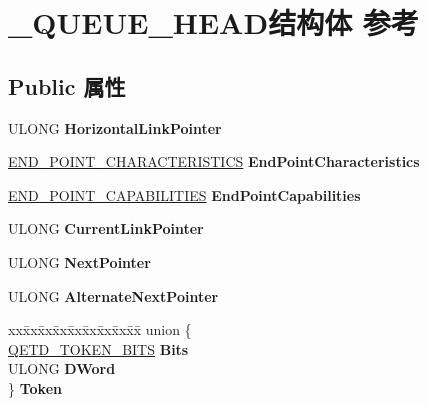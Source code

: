 \hypertarget{struct___q_u_e_u_e___h_e_a_d}{}\section{\+\_\+\+Q\+U\+E\+U\+E\+\_\+\+H\+E\+A\+D结构体 参考}
\label{struct___q_u_e_u_e___h_e_a_d}
\subsection*{Public 属性}
\begin{DoxyCompactItemize}
\item 
\mbox{\label{struct___q_u_e_u_e___h_e_a_d_a395e6d779b41b678e78476a8bbb34185}} 
U\+L\+O\+NG {\bfseries Horizontal\+Link\+Pointer}
\item 
\mbox{\label{struct___q_u_e_u_e___h_e_a_d_a80b0e12fb9069284bbbed667fff9c507}} 
\hyperlink{struct___e_n_d___p_o_i_n_t___c_h_a_r_a_c_t_e_r_i_s_t_i_c_s}{E\+N\+D\+\_\+\+P\+O\+I\+N\+T\+\_\+\+C\+H\+A\+R\+A\+C\+T\+E\+R\+I\+S\+T\+I\+CS} {\bfseries End\+Point\+Characteristics}
\item 
\mbox{\label{struct___q_u_e_u_e___h_e_a_d_a0453a99eefc407c5691c70e96783b9ee}} 
\hyperlink{struct___e_n_d___p_o_i_n_t___c_a_p_a_b_i_l_i_t_i_e_s}{E\+N\+D\+\_\+\+P\+O\+I\+N\+T\+\_\+\+C\+A\+P\+A\+B\+I\+L\+I\+T\+I\+ES} {\bfseries End\+Point\+Capabilities}
\item 
\mbox{\label{struct___q_u_e_u_e___h_e_a_d_a1119465dd76bf8425b6ae3af01d3d299}} 
U\+L\+O\+NG {\bfseries Current\+Link\+Pointer}
\item 
\mbox{\label{struct___q_u_e_u_e___h_e_a_d_aef7d552ba52c7b685cef1c79c8c46412}} 
U\+L\+O\+NG {\bfseries Next\+Pointer}
\item 
\mbox{\label{struct___q_u_e_u_e___h_e_a_d_a6ee48a4e2c8e642ab37b1d3abf6a4750}} 
U\+L\+O\+NG {\bfseries Alternate\+Next\+Pointer}
\item 
\mbox{\label{struct___q_u_e_u_e___h_e_a_d_a1f1ca39d004e13f713d387e53864ce23}} 
\begin{tabbing}
xx\=xx\=xx\=xx\=xx\=xx\=xx\=xx\=xx\=\kill
union \{\\
\>\hyperlink{struct___q_e_t_d___t_o_k_e_n___b_i_t_s}{QETD\_TOKEN\_BITS} {\bfseries Bits}\\
\>ULONG {\bfseries DWord}\\
\} {\bfseries Token}\\


\end{tabbing}
\end{DoxyCompactItemize}
